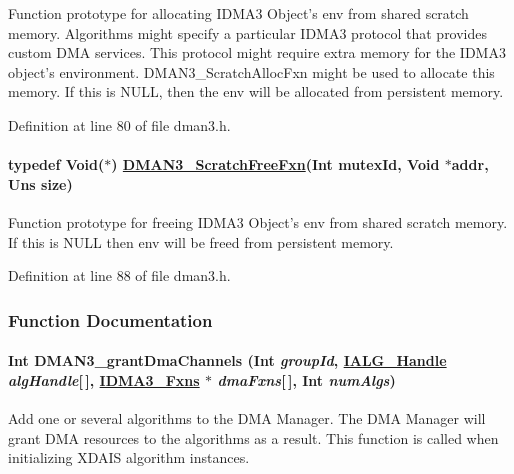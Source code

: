 Function prototype for allocating IDMA3 Object's env from shared scratch memory. Algorithms might specify a particular IDMA3 protocol that provides custom DMA services. This protocol might require extra memory for the IDMA3 object's environment. DMAN3\_\-Scratch\-Alloc\-Fxn might be used to allocate this memory. If this is NULL, then the env will be allocated from persistent memory. 



Definition at line 80 of file dman3.h.\hypertarget{group___d_s_p_d_m_a_n3_g5c51dee2c06d775005a8cf4db004782f}{
\paragraph[DMAN3\_\-ScratchFreeFxn]{\setlength{\rightskip}{0pt plus 5cm}typedef Void($\ast$) \hyperlink{group___d_s_p_d_m_a_n3_g5c51dee2c06d775005a8cf4db004782f}{DMAN3\_\-Scratch\-Free\-Fxn}(Int mutex\-Id, Void $\ast$addr, Uns size)}\hfill}
\label{group___d_s_p_d_m_a_n3_g5c51dee2c06d775005a8cf4db004782f}


Function prototype for freeing IDMA3 Object's env from shared scratch memory. If this is NULL then env will be freed from persistent memory. 



Definition at line 88 of file dman3.h.

\subsubsection{Function Documentation}
\hypertarget{group___d_s_p_d_m_a_n3_ge0e5031bc5e947da1bd5d12cca1c5e00}{
\paragraph[DMAN3\_\-grantDmaChannels]{\setlength{\rightskip}{0pt plus 5cm}Int DMAN3\_\-grant\-Dma\-Channels (Int {\em group\-Id}, \hyperlink{struct_i_a_l_g___obj}{IALG\_\-Handle} {\em alg\-Handle}\mbox{[}$\,$\mbox{]}, \hyperlink{struct_i_d_m_a3___fxns}{IDMA3\_\-Fxns} $\ast$ {\em dma\-Fxns}\mbox{[}$\,$\mbox{]}, Int {\em num\-Algs})}\hfill}
\label{group___d_s_p_d_m_a_n3_ge0e5031bc5e947da1bd5d12cca1c5e00}


Add one or several algorithms to the DMA Manager. The DMA Manager will grant DMA resources to the algorithms as a result. This function is called when initializing XDAIS algorithm instances. 

